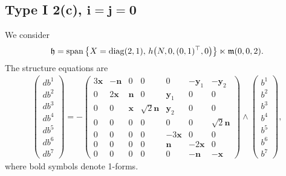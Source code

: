 \documentclass[pdftex]{sigma}
\numberwithin{equation}{section}
\newcommand\fh{{\frak h}}
\newcommand\fm{{\frak m}}
\newcommand\bx{{\mathbf x}}
\newcommand\by{{\mathbf y}}
\newcommand\bn{{\mathbf n}}
\newcommand{\Span}{\operatorname{span}}
\newcommand{\diag}{\operatorname{diag}}
\begin{document}
\subsection[Type I 2(c), $i=j=0$]{Type I 2(c), $\boldsymbol{i=j=0}$}
We consider
\begin{gather*}\fh=\Span\big\{X=\diag(2,1),\, h\big(N,0,(0,1)^\top,0\big) \big\}\ltimes\fm(0,0,2).\end{gather*}
The structure equations are
\begin{gather}\label{EI2(c)}\left(\begin{matrix} db^1\\db^2\\db^3\\db^4\\db^5\\db^6\\db^7\end{matrix}\right) = -\left(
\begin{matrix}
3{\bx} &-\bn&0&0&0&-\by_1&-\by_2\\
0&2\bx&\bn&0&\by_1&0&0\\
0&0&\bx&\sqrt 2 \bn&\by_2&0&0\\
0&0&0&0&0&0&\sqrt 2 \bn\\
0&0&0&0&-3\bx&0&0\\
0&0&0&0&\bn&-2\bx&0\\
0&0&0&0&0&-\bn&-\bx
\end{matrix}\right) \wedge \left(\begin{matrix} b^1\\b^2\\b^3\\b^4\\b^5\\b^6\\b^7\end{matrix}\right),
\end{gather}
where bold symbols denote 1-forms.
\end{document}
